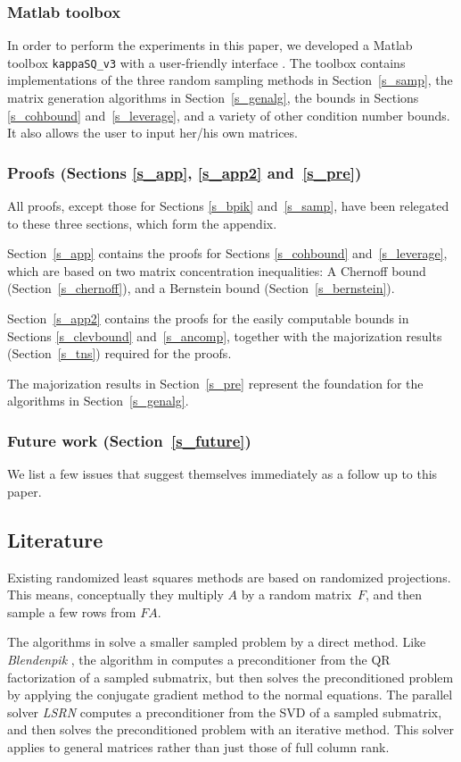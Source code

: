 \documentclass{siamltex}
\begin{document}
\subsubsection*{Matlab toolbox}
In order to perform the experiments in this paper, 
we developed a Matlab toolbox \texttt{kappaSQ\_v3} 
with a user-friendly interface \cite{impl}.
The toolbox contains
implementations of the three random sampling methods in Section~\ref{s_samp},
the matrix generation algorithms in Section~\ref{s_genalg}, 
the bounds in Sections \ref{s_cohbound} and~\ref{s_leverage}, and a variety
of other
condition number bounds. It also allows the user to input her/his own
matrices.

\subsubsection*{Proofs (Sections \ref{s_app}, \ref{s_app2} and~\ref{s_pre})}
All proofs, except those for Sections \ref{s_bpik} and~\ref{s_samp},
have been relegated to these three sections, which form the appendix. 

Section~\ref{s_app} contains the proofs for 
Sections \ref{s_cohbound} and~\ref{s_leverage}, which are based on 
two matrix concentration inequalities:
A Chernoff bound  (Section~\ref{s_chernoff}), and a Bernstein bound
(Section~\ref{s_bernstein}).

Section~\ref{s_app2} contains the proofs
for the easily computable bounds in Sections \ref{s_clevbound} 
and~\ref{s_ancomp},
together with the majorization results (Section~\ref{s_tns}) 
required for the proofs.

The majorization results in Section~\ref{s_pre} represent the foundation
for the algorithms in Section~\ref{s_genalg}.

\subsubsection*{Future work (Section~\ref{s_future})}
We list a few issues that suggest
themselves immediately as a follow up to this paper.

\subsection{Literature}
Existing randomized least squares methods are based on 
randomized projections. This means, conceptually they
multiply $A$ by a random matrix~$F$, and then sample
a few rows from $FA$.

The algorithms in \cite{BDr09,DMM06a,DMMS10} solve a smaller sampled
problem by a direct method.  Like \textsl{Blendenpik} \cite{AMTol10},
the algorithm
in \cite{RokT08} computes a preconditioner from the QR factorization
of a sampled submatrix, but then solves the preconditioned problem
by applying the conjugate gradient method to the normal equations.
The parallel solver \textsl{LSRN} \cite{MSM11} computes a
preconditioner from the SVD of a sampled submatrix, and then
solves the preconditioned problem with an iterative
method. This solver applies to general matrices
rather than just those of full column rank.
\end{document}
